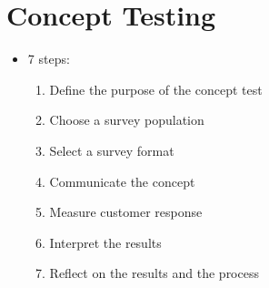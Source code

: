 \documentclass[a4paper,12pt,openany]{book}
\begin{document}
\chapter{Concept Testing}
\begin{itemize}
    \item 7 steps:
    \begin{enumerate}
        \item Define the purpose of the concept test
        \item Choose a survey population
        \item Select a survey format
        \item Communicate the concept
        \item Measure customer response
        \item Interpret the results
        \item Reflect on the results and the process
    \end{enumerate}
\end{itemize}
\end{document}
